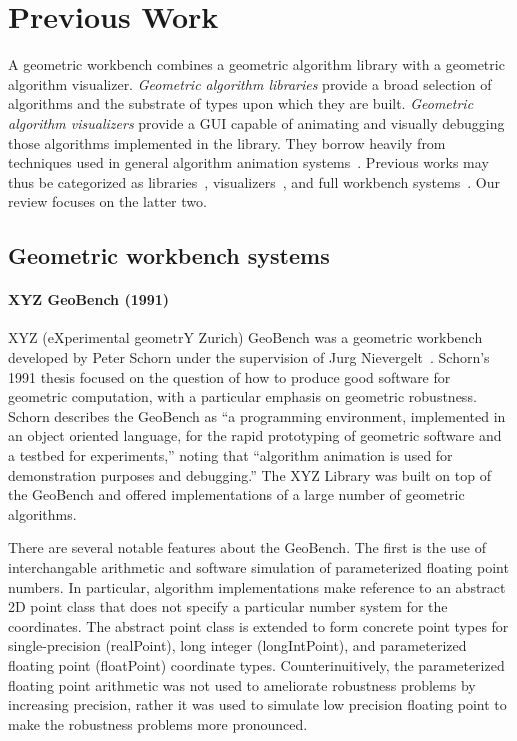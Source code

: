 \section{Previous Work} 

A geometric workbench combines a geometric algorithm library with a geometric
algorithm visualizer. \emph{Geometric algorithm libraries} provide a broad
selection of algorithms and the substrate of types upon which they are built.
\emph{Geometric algorithm visualizers} provide a GUI capable of animating and
visually debugging those algorithms implemented in the library. They borrow
heavily from techniques used in general algorithm animation
systems~\cite{brown1984system, stasko1990tango, stasko1995polka,
stasko1995samba}. Previous works may thus be categorized as
libraries~\cite{mehlhorn1989leda, fabri1998design, overmars1996designing,
fabri1996cgal}, visualizers~\cite{phillips1993geomview, hanson1994interactive,
amenta1995geomview, basken2002geowin}, and full workbench
systems~\cite{schorn1991robust, de1993geolab, de1993animation,
epstein1994workbench, tal1995visualization, shneerson1997gasp,
wei2009geobuilder}. Our review focuses on the latter two.

\subsection{Geometric workbench systems}

\paragraph{XYZ GeoBench (1991)}

XYZ (eXperimental geometrY Zurich) GeoBench was a geometric workbench developed
by Peter Schorn under the supervision of Jurg
Nievergelt~\cite{schorn1991robust}. Schorn's 1991 thesis focused on the question
of how to produce good software for geometric computation, with a particular
emphasis on geometric robustness. Schorn describes the GeoBench as ``a
programming environment, implemented in an object oriented language, for the
rapid prototyping of geometric software and a testbed for experiments,'' noting
that ``algorithm animation is used for demonstration purposes and debugging.''
The XYZ Library was built on top of the GeoBench and offered implementations of
a large number of geometric algorithms.

There are several notable features about the GeoBench. The first is the use of
interchangable arithmetic and software simulation of parameterized floating
point numbers. In particular, algorithm implementations make reference to an
abstract 2D point class that does not specify a particular number system for the
coordinates. The abstract point class is extended to form concrete point types
for single-precision (realPoint), long integer (longIntPoint), and parameterized
floating point (floatPoint) coordinate types. Counterinuitively, the
parameterized floating point arithmetic was not used to ameliorate robustness
problems by increasing precision, rather it was used to simulate low precision
floating point to make the robustness problems more pronounced.

